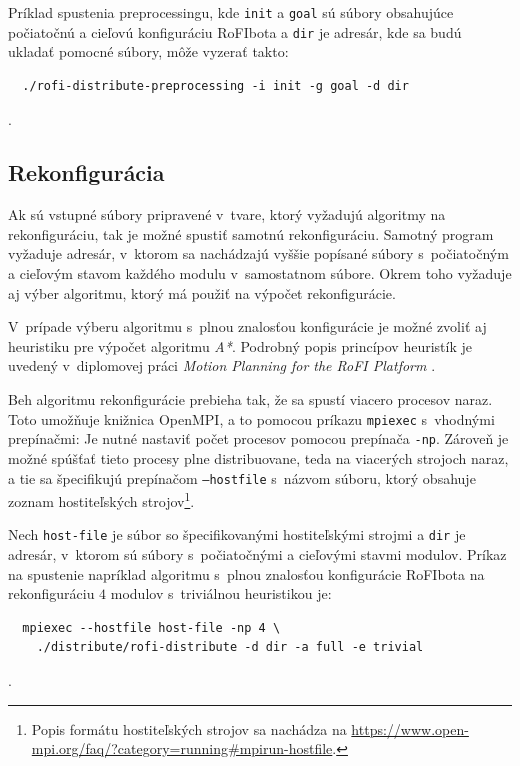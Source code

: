 \documentclass[
  printed, %
  oneside, %
  notable,   %
  nolof,     %
  nolot,     %
]{fithesis3}
\begin{document}
Príklad spustenia preprocessingu, kde \texttt{init} a \texttt{goal} sú súbory obsahujúce počiatočnú a cieľovú konfiguráciu RoFIbota a \texttt{dir} je adresár, kde sa budú ukladať pomocné súbory, môže vyzerať takto:

\begin{verbatim}
  ./rofi-distribute-preprocessing -i init -g goal -d dir
\end{verbatim}.

\subsection{Rekonfigurácia}
Ak sú vstupné súbory pripravené v~tvare, ktorý vyžadujú algoritmy na rekonfiguráciu, tak je možné spustiť samotnú rekonfiguráciu. Samotný program vyžaduje adresár, v~ktorom sa nachádzajú vyššie popísané súbory s~počiatočným a cieľovým stavom každého modulu v~samostatnom súbore. Okrem toho vyžaduje aj výber algoritmu, ktorý má použiť na výpočet rekonfigurácie. 

V~prípade výberu algoritmu s~plnou znalosťou konfigurácie je možné zvoliť aj heuristiku pre výpočet algoritmu \textit{A*}. Podrobný popis princípov heuristík je uvedený v~diplomovej práci \textit{Motion Planning for the RoFI Platform} \cite{vozarovaMasterThesis}. 

Beh algoritmu rekonfigurácie prebieha tak, že sa spustí viacero procesov naraz. Toto umožňuje knižnica OpenMPI, a to pomocou príkazu \texttt{mpiexec} s~vhodnými prepínačmi: Je nutné nastaviť počet procesov pomocou prepínača \texttt{-np}. Zároveň je možné spúšťať tieto procesy plne distribuovane, teda na viacerých strojoch naraz, a tie sa špecifikujú prepínačom \texttt{--hostfile} s~názvom súboru, ktorý obsahuje zoznam hostiteľských strojov\footnote{Popis formátu hostiteľských strojov sa nachádza na \url{https://www.open-mpi.org/faq/?category=running\#mpirun-hostfile}.}. 

Nech \texttt{host-file} je súbor so špecifikovanými hostiteľskými strojmi a \texttt{dir} je adresár, v~ktorom sú súbory s~počiatočnými a cieľovými stavmi modulov. Príkaz na spustenie napríklad algoritmu s~plnou znalosťou konfigurácie RoFIbota na rekonfiguráciu $4$ modulov s~triviálnou heuristikou je: 
\begin{verbatim}
  mpiexec --hostfile host-file -np 4 \
    ./distribute/rofi-distribute -d dir -a full -e trivial
\end{verbatim}.
\end{document}
